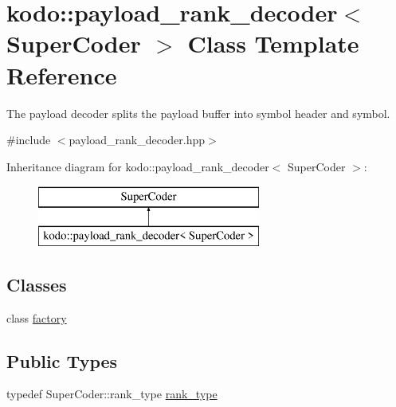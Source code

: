 \hypertarget{classkodo_1_1payload__rank__decoder}{\section{kodo\-:\-:payload\-\_\-rank\-\_\-decoder$<$ Super\-Coder $>$ Class Template Reference}
\label{classkodo_1_1payload__rank__decoder}
}


The payload decoder splits the payload buffer into symbol header and symbol.  




{\ttfamily \#include $<$payload\-\_\-rank\-\_\-decoder.\-hpp$>$}

Inheritance diagram for kodo\-:\-:payload\-\_\-rank\-\_\-decoder$<$ Super\-Coder $>$\-:\begin{figure}[H]
\begin{center}
\leavevmode
\includegraphics[height=2.000000cm]{classkodo_1_1payload__rank__decoder}
\end{center}
\end{figure}
\subsection*{Classes}
\begin{DoxyCompactItemize}
\item 
class \hyperlink{classkodo_1_1payload__rank__decoder_1_1factory}{factory}
\end{DoxyCompactItemize}
\subsection*{Public Types}
\begin{DoxyCompactItemize}
\item 
typedef Super\-Coder\-::rank\-\_\-type \hyperlink{classkodo_1_1payload__rank__decoder_acd7741c3a43c976696a0b63d9a35bf60}{rank\-\_\-type}
\begin{DoxyCompactList}\small\item\em \end{DoxyCompactList}\end{DoxyCompactItemize}
